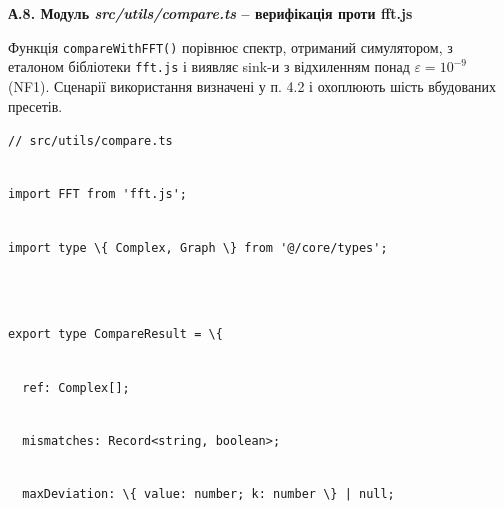 \documentclass[
]{article}
\newcommand{\passthrough}[1]{#1}
\begin{document}
\textbf{А.8. Модуль \emph{src/utils/compare.ts} -- верифікація проти
fft.js}

Функція
\passthrough{\lstinline!compareWithFFT!}\passthrough{\lstinline!()!}
порівнює спектр, отриманий симулятором, з еталоном бібліотеки
\passthrough{\lstinline!fft!}\passthrough{\lstinline!.!}\passthrough{\lstinline!js!}
і виявляє sink-и з відхиленням понад \(\varepsilon = 10^{- 9}\) (NF1).
Сценарії використання визначені у п. 4.2 і охоплюють шість вбудованих
пресетів.

\passthrough{\lstinline!//!}\passthrough{\lstinline! !}\passthrough{\lstinline!src!}\passthrough{\lstinline!/utils/!}\passthrough{\lstinline!compare.ts!}\strut \\
\passthrough{\lstinline!import!}\passthrough{\lstinline! !}\passthrough{\lstinline!FFT!}\passthrough{\lstinline! !}\passthrough{\lstinline!from!}\passthrough{\lstinline! !}\passthrough{\lstinline!'fft.js';!}\strut \\
\passthrough{\lstinline!import!}\passthrough{\lstinline! !}\passthrough{\lstinline!type!}\passthrough{\lstinline! !}\passthrough{\lstinline!\{!}\passthrough{\lstinline! !}\passthrough{\lstinline!Complex,!}\passthrough{\lstinline! !}\passthrough{\lstinline!Graph!}\passthrough{\lstinline! !}\passthrough{\lstinline!\}!}\passthrough{\lstinline! !}\passthrough{\lstinline!from!}\passthrough{\lstinline! !}\passthrough{\lstinline!'@/core/types';!}\strut \\
\strut \\
\passthrough{\lstinline!export!}\passthrough{\lstinline! !}\passthrough{\lstinline!type!}\passthrough{\lstinline! !}\passthrough{\lstinline!CompareResult!}\passthrough{\lstinline! !}\passthrough{\lstinline!=!}\passthrough{\lstinline! !}\passthrough{\lstinline!\{!}\strut \\
\passthrough{\lstinline!  !}\passthrough{\lstinline!ref:!}\passthrough{\lstinline! !}\passthrough{\lstinline!Complex[];!}\strut \\
\passthrough{\lstinline!  !}\passthrough{\lstinline!mismatches:!}\passthrough{\lstinline! !}\passthrough{\lstinline!Record<string,!}\passthrough{\lstinline! !}\passthrough{\lstinline!boolean>;!}\strut \\
\passthrough{\lstinline!  !}\passthrough{\lstinline!maxDeviation!}\passthrough{\lstinline!:!}\passthrough{\lstinline! !}\passthrough{\lstinline!\{!}\passthrough{\lstinline! !}\passthrough{\lstinline!value:!}\passthrough{\lstinline! !}\passthrough{\lstinline!number;!}\passthrough{\lstinline! !}\passthrough{\lstinline!k:!}\passthrough{\lstinline! !}\passthrough{\lstinline!number!}\passthrough{\lstinline! !}\passthrough{\lstinline!\}!}\passthrough{\lstinline! !}\passthrough{\lstinline!|!}\passthrough{\lstinline! !}\passthrough{\lstinline!null;!}\strut \\
\end{document}
